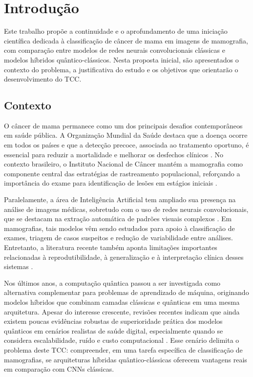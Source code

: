 \documentclass[
    12pt,
    openright,
    oneside,
    a4paper,
    english,
    brazil
]{abntex2}
\begin{document}
\chapter{Introdução}
\label{cap:introducao}

Este trabalho propõe a continuidade e o aprofundamento de uma iniciação científica dedicada à classificação de câncer de mama em imagens de mamografia, com comparação entre modelos de redes neurais convolucionais clássicas e modelos híbridos quântico-clássicos. Nesta proposta inicial, são apresentados o contexto do problema, a justificativa do estudo e os objetivos que orientarão o desenvolvimento do TCC.

\section{Contexto}
\label{sec:contexto}

O câncer de mama permanece como um dos principais desafios contemporâneos em saúde pública. A Organização Mundial da Saúde destaca que a doença ocorre em todos os países e que a detecção precoce, associada ao tratamento oportuno, é essencial para reduzir a mortalidade e melhorar os desfechos clínicos \cite{WHO2025BreastCancer}. No contexto brasileiro, o Instituto Nacional de Câncer mantém a mamografia como componente central das estratégias de rastreamento populacional, reforçando a importância do exame para identificação de lesões em estágios iniciais \cite{INCA2025Rastreamento}.

Paralelamente, a área de Inteligência Artificial tem ampliado sua presença na análise de imagens médicas, sobretudo com o uso de redes neurais convolucionais, que se destacam na extração automática de padrões visuais complexos \cite{LeCun2015}. Em mamografias, tais modelos vêm sendo estudados para apoio à classificação de exames, triagem de casos suspeitos e redução de variabilidade entre análises. Entretanto, a literatura recente também aponta limitações importantes relacionadas à reprodutibilidade, à generalização e à interpretação clínica desses sistemas \cite{Bhalla2023MammographyReview}.

Nos últimos anos, a computação quântica passou a ser investigada como alternativa complementar para problemas de aprendizado de máquina, originando modelos híbridos que combinam camadas clássicas e quânticas em uma mesma arquitetura. Apesar do interesse crescente, revisões recentes indicam que ainda existem poucas evidências robustas de superioridade prática dos modelos quânticos em cenários realistas de saúde digital, especialmente quando se considera escalabilidade, ruído e custo computacional \cite{Gupta2025QMLDigitalHealth}. Esse cenário delimita o problema deste TCC: compreender, em uma tarefa específica de classificação de mamografias, se arquiteturas híbridas quântico-clássicas oferecem vantagens reais em comparação com CNNs clássicas.
\end{document}
